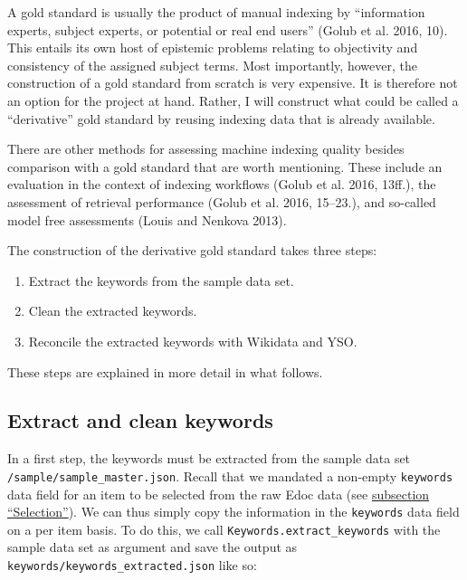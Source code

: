 A gold standard is usually the product of manual indexing by
``information experts, subject experts, or potential or real end users''
(Golub et al. 2016, 10). This entails its own host of epistemic problems
relating to objectivity and consistency of the assigned subject terms.
Most importantly, however, the construction of a gold standard from
scratch is very expensive. It is therefore not an option for the project
at hand. Rather, I will construct what could be called a ``derivative''
gold standard by reusing indexing data that is already available.

There are other methods for assessing machine indexing quality besides
comparison with a gold standard that are worth mentioning. These include
an evaluation in the context of indexing workflows (Golub et al. 2016,
13ff.), the assessment of retrieval performance (Golub et al. 2016,
15--23.), and so-called model free assessments (Louis and Nenkova 2013).

The construction of the derivative gold standard takes three steps:

\begin{enumerate}
\def\labelenumi{\arabic{enumi}.}
\tightlist
\item
  Extract the keywords from the sample data set.
\item
  Clean the extracted keywords.
\item
  Reconcile the extracted keywords with Wikidata and YSO.
\end{enumerate}

These steps are explained in more detail in what follows.

\hypertarget{extract-and-clean-keywords}{%
\subsection{Extract and clean
keywords}\label{extract-and-clean-keywords}}

In a first step, the keywords must be extracted from the sample data set
\texttt{/sample/sample\_master.json}. Recall that we mandated a
non-empty \texttt{keywords} data field for an item to be selected from
the raw Edoc data (see \protect\hyperlink{selection}{subsection
``Selection''}). We can thus simply copy the information in the
\texttt{keywords} data field on a per item basis. To do this, we call
\texttt{Keywords.extract\_keywords} with the sample data set as argument
and save the output as \texttt{keywords/keywords\_extracted.json} like
so:

\begin{Shaded}
\begin{Highlighting}[]
\OperatorTok{=}\NormalTok{)}
\NormalTok{)}
\end{Highlighting}
\end{Shaded}

